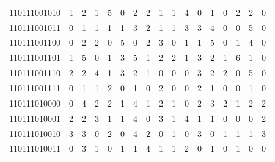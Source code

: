 \documentclass[10pt,a4paper]{article}
\begin{document}
\begin{longtable}{ |c|c|c|c|c|c|c|c|c|c|c|c|c|c|c|c|c| }
    110111001010              & 1                            & 2                                & 1                            & 5                              & 0   & 2   & 2   & 1   & 1   & 4   & 0   & 1   & 0   & 2   & 2   & 0   \\
    110111001011              & 0                            & 1                                & 1                            & 1                              & 1   & 3   & 2   & 1   & 1   & 3   & 3   & 4   & 0   & 0   & 5   & 0   \\
    110111001100              & 0                            & 2                                & 2                            & 0                              & 5   & 0   & 2   & 3   & 0   & 1   & 1   & 5   & 0   & 1   & 4   & 0   \\
    110111001101              & 1                            & 5                                & 0                            & 1                              & 3   & 5   & 1   & 2   & 2   & 1   & 3   & 2   & 1   & 6   & 1   & 0   \\
    110111001110              & 2                            & 2                                & 4                            & 1                              & 3   & 2   & 1   & 0   & 0   & 0   & 3   & 2   & 2   & 0   & 5   & 0   \\
    110111001111              & 0                            & 1                                & 1                            & 2                              & 0   & 1   & 0   & 2   & 0   & 0   & 2   & 1   & 0   & 0   & 1   & 0   \\
    110111010000              & 0                            & 4                                & 2                            & 2                              & 1   & 4   & 1   & 2   & 1   & 0   & 2   & 3   & 2   & 1   & 2   & 2   \\
    110111010001              & 2                            & 2                                & 3                            & 1                              & 1   & 4   & 0   & 3   & 1   & 4   & 1   & 1   & 0   & 0   & 0   & 2   \\
    110111010010              & 3                            & 3                                & 0                            & 2                              & 0   & 4   & 2   & 0   & 1   & 0   & 3   & 0   & 1   & 1   & 1   & 3   \\
    110111010011              & 0                            & 3                                & 1                            & 0                              & 1   & 1   & 4   & 1   & 1   & 2   & 0   & 1   & 0   & 1   & 0   & 0   \\

\end{longtable}
\end{document}
